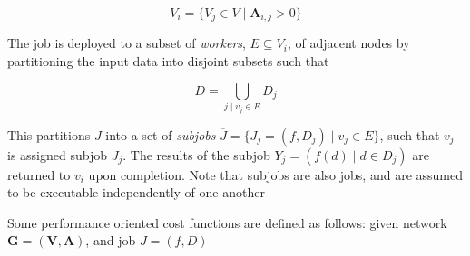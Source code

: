 \documentclass[../mthe-493-project-proposal.tex]{subfiles}
\begin{document}
    \begin{equation*}
        V_i = \{V_j \in V \mid \mathbf{A}_{i,j} > 0\}
    \end{equation*}

    The job is deployed to a subset of \textit{workers}, $E \subseteq V_i$, of adjacent nodes by partitioning the input data into disjoint subsets such that

    \begin{equation*}
        D = \bigcup\limits_{j \mid v_j \in E} D_j
    \end{equation*}

    This partitions $J$ into a set of \textit{subjobs} $\overline{J} = \{J_j = (f, D_j) \mid v_j \in E\}$, such that $v_j$ is assigned subjob $J_j$. The results of the subjob $Y_j = (f(d) \mid d \in D_j)$ are returned to $v_i$ upon completion. Note that subjobs are also jobs, and are assumed to be executable independently of one another

    Some performance oriented cost functions are defined as follows: given network $\mathbf{G} = (\mathbf{V}, \mathbf{A})$, and job $J = (f, D)$
\end{document}
